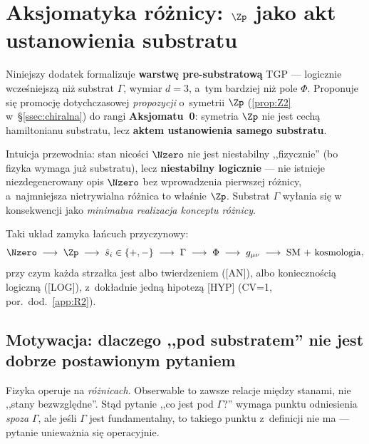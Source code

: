 \section{Aksjomatyka r\'o\.znicy: $\Zp$ jako akt ustanowienia substratu}%
\label{app:aksjomatyka-roznicy}

Niniejszy dodatek formalizuje \textbf{warstw\k{e} pre-substratow\k{a}}
TGP --- logicznie wcze\'sniejsz\k{a} ni\.z substrat $\Gamma$, wymiar
$d=3$, a~tym bardziej ni\.z pole $\Phi$. Proponuje si\k{e} promocj\k{e}
dotychczasowej \emph{propozycji} o~symetrii $\Zp$
(\ref{prop:Z2} w~\S\ref{ssec:chiralna}) do rangi \textbf{Aksjomatu~0}:
symetria $\Zp$ nie jest cech\k{a} hamiltonianu substratu, lecz
\textbf{aktem ustanowienia samego substratu}.

Intuicja przewodnia: stan nicości $\Nzero$ nie jest
niestabilny ,,fizycznie'' (bo fizyka wymaga ju\.z substratu), lecz
\textbf{niestabilny logicznie} --- nie istnieje niezdegenerowany
opis $\Nzero$ bez wprowadzenia pierwszej r\'o\.znicy, a~najmniejsza
nietrywialna r\'o\.znica to w\l{}a\'snie $\Zp$. Substrat $\Gamma$
wy\l{}ania si\k{e} w konsekwencji jako \emph{minimalna realizacja
konceptu r\'o\.znicy}.

Taki uk\l{}ad zamyka \l{}a\'ncuch przyczynowy:
\[
  \Nzero \;\longrightarrow\; \Zp
  \;\longrightarrow\; \hat{s}_i \in \{+,-\}
  \;\longrightarrow\; \Gamma
  \;\longrightarrow\; \Phi
  \;\longrightarrow\; g_{\mu\nu}
  \;\longrightarrow\; \text{SM + kosmologia},
\]
przy czym ka\.zda strza\l{}ka jest albo twierdzeniem ([AN]), albo
konieczno\'sci\k{a} logiczn\k{a} ([LOG]), z~dok\l{}adnie jedn\k{a}
hipotez\k{a} [HYP] (CV=1, por.\ dod.~\ref{app:R2}).

\subsection{Motywacja: dlaczego ,,pod substratem'' nie jest dobrze
            postawionym pytaniem}%
\label{app:0-motywacja}

Fizyka operuje na \emph{r\'o\.znicach}. Obserwable to zawsze relacje
mi\k{e}dzy stanami, nie ,,stany bezwzgl\k{e}dne''. St\k{a}d pytanie
,,co jest pod $\Gamma$?'' wymaga punktu odniesienia
\emph{spoza} $\Gamma$, ale je\'sli $\Gamma$ jest fundamentalny, to
takiego punktu z~definicji nie ma --- pytanie unieważnia si\k{e}
operacyjnie.

